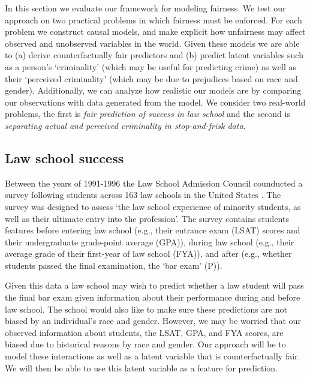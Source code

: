 In this section we evaluate our framework for modeling fairness. We test our approach on two practical problems in which fairness must be enforced. For each problem we construct causal models, and make explicit how unfairness may affect observed and unobserved variables in the world. Given these models we are able to (a) derive counterfactually fair predictors and (b) predict latent variables such as a person's `criminality' (which may be useful for predicting crime) as well as their `perceived criminality' (which may be due to prejudices based on race and gender). Additionally, we can analyze how realistic our models are by comparing our observations with data generated from the model. We consider two real-world problems, the first is \emph{fair prediction of success in law school} and the second is \emph{separating actual and perceived criminality in stop-and-frisk data}.

\subsection{Law school success}
Between the years of 1991-1996 the Law School Admission Council counducted a survey following students across 163 law schools in the United States \cite{wightman1998lsac}. The survey was designed to assess `the law school experience of minority students, as well as their ultimate entry into the profession'. The survey contains students features before entering law school (e.g., their entrance exam (LSAT) scores and their undergraduate grade-point average (GPA)), during law school (e.g., their average grade of their first-year of law school (FYA)), and after (e.g., whether students passed the final examination, the `bar exam' (P)). 

Given this data a law school may wish to predict whether a law student will pass the final bar exam given information about their performance during and before law school. The school would also like to make sure these predictions are not biased by an individual's race and gender. However, we may be worried that our observed information about students, the LSAT, GPA, and FYA scores, are biased due to historical reasons by race and gender. Our approach will be to model these interactions as well as a latent variable that is counterfactually fair. We will then be able to use this latent variable as a feature for prediction.

